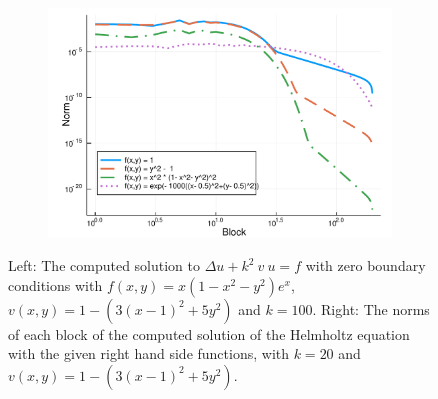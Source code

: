 \documentclass[11pt, oneside]{article}   	%
\begin{document}
\begin{figure}[t]
	\begin{subfigure}{0.5\textwidth}
	\includegraphics[scale=0.5]{solutionblocknorms-helmholtz-k=20}
	\centering
	\end{subfigure}
	\caption{Left: The computed solution to $\Delta u + k^2 \: v \: u = f$ with zero boundary conditions with $f(x,y) = x(1-x^2-y^2)e^x$, $v(x,y) = 1 - (3(x-1)^2 + 5y^2)$ and $k = 100$. Right: The norms of each block of the computed solution of the Helmholtz equation with the given right hand side functions, with $k=20$ and $v(x,y) = 1 - (3(x-1)^2 + 5y^2)$.}
	\centering
	\label{fig:helmholtz}
\end{figure}
\end{document}
